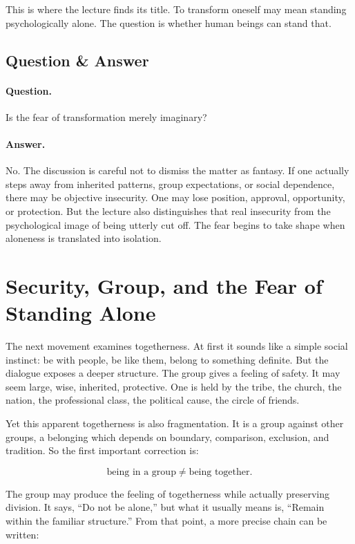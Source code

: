 This is where the lecture finds its title. To transform oneself may mean standing psychologically alone. The question is whether human beings can stand that.

\subsection{Question \& Answer}

\paragraph{Question.}
Is the fear of transformation merely imaginary?

\paragraph{Answer.}
No. The discussion is careful not to dismiss the matter as fantasy. If one actually steps away from inherited patterns, group expectations, or social dependence, there may be objective insecurity. One may lose position, approval, opportunity, or protection. But the lecture also distinguishes that real insecurity from the psychological image of being utterly cut off. The fear begins to take shape when aloneness is translated into isolation.

\section{Security, Group, and the Fear of Standing Alone}

The next movement examines togetherness. At first it sounds like a simple social instinct: be with people, be like them, belong to something definite. But the dialogue exposes a deeper structure. The group gives a feeling of safety. It may seem large, wise, inherited, protective. One is held by the tribe, the church, the nation, the professional class, the political cause, the circle of friends.

Yet this apparent togetherness is also fragmentation. It is a group against other groups, a belonging which depends on boundary, comparison, exclusion, and tradition. So the first important correction is:

\begin{equation}
\text{being in a group} \neq \text{being together}.
\end{equation}

The group may produce the feeling of togetherness while actually preserving division. It says, ``Do not be alone,'' but what it usually means is, ``Remain within the familiar structure.'' From that point, a more precise chain can be written:

